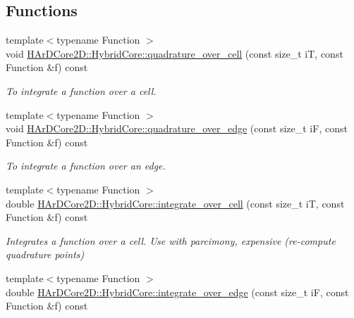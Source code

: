 \subsection*{Functions}
\begin{DoxyCompactItemize}
\item 
\mbox{\label{group__HybridCore2D_ga3c33c8cec55dbe2d8873e53fcd43d01f}} 
{\footnotesize template$<$typename Function $>$ }\\void \hyperlink{group__HybridCore2D_ga3c33c8cec55dbe2d8873e53fcd43d01f}{H\+Ar\+D\+Core2\+D\+::\+Hybrid\+Core\+::quadrature\+\_\+over\+\_\+cell} (const size\+\_\+t iT, const Function \&f) const
\begin{DoxyCompactList}\small\item\em To integrate a function over a cell. \end{DoxyCompactList}\item 
\mbox{\label{group__HybridCore2D_gafbf9c61f2d929331197ba971b52b8710}} 
{\footnotesize template$<$typename Function $>$ }\\void \hyperlink{group__HybridCore2D_gafbf9c61f2d929331197ba971b52b8710}{H\+Ar\+D\+Core2\+D\+::\+Hybrid\+Core\+::quadrature\+\_\+over\+\_\+edge} (const size\+\_\+t iF, const Function \&f) const
\begin{DoxyCompactList}\small\item\em To integrate a function over an edge. \end{DoxyCompactList}\item 
\mbox{\label{group__HybridCore2D_ga64ffbc44306e06018efe3cea5a62f652}} 
{\footnotesize template$<$typename Function $>$ }\\double \hyperlink{group__HybridCore2D_ga64ffbc44306e06018efe3cea5a62f652}{H\+Ar\+D\+Core2\+D\+::\+Hybrid\+Core\+::integrate\+\_\+over\+\_\+cell} (const size\+\_\+t iT, const Function \&f) const
\begin{DoxyCompactList}\small\item\em Integrates a function over a cell. Use with parcimony, expensive (re-\/compute quadrature points) \end{DoxyCompactList}\item 
\mbox{\label{group__HybridCore2D_ga03f276ea9c905d64662c39b7555d560c}} 
{\footnotesize template$<$typename Function $>$ }\\double \hyperlink{group__HybridCore2D_ga03f276ea9c905d64662c39b7555d560c}{H\+Ar\+D\+Core2\+D\+::\+Hybrid\+Core\+::integrate\+\_\+over\+\_\+edge} (const size\+\_\+t iF, const Function \&f) const

\end{DoxyCompactItemize}
